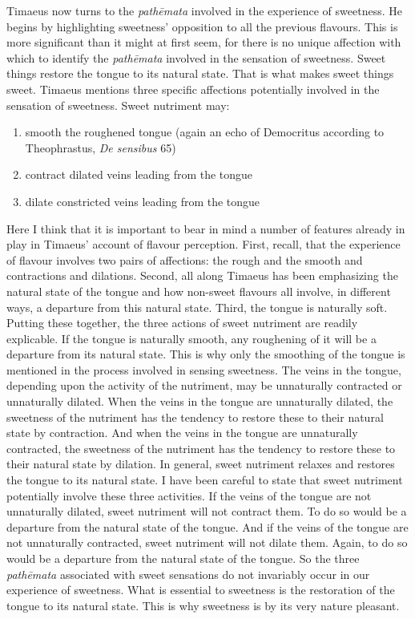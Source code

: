 Timaeus now turns to the \emph{pathēmata} involved in the experience of sweetness. He begins by highlighting sweetness' opposition to all the previous flavours. This is more significant than it might at first seem, for there is no unique affection with which to identify the \emph{pathēmata} involved in the sensation of sweetness. Sweet things restore the tongue to its natural state. That is what makes sweet things sweet. Timaeus mentions three specific affections potentially involved in the sensation of sweetness. Sweet nutriment may:
\begin{enumerate}[(1)]
	\item smooth the roughened tongue (again an echo of Democritus according to Theophrastus, \emph{De sensibus} 65)
	\item contract dilated veins leading from the tongue
	\item dilate constricted veins leading from the tongue
\end{enumerate}
Here I think that it is important to bear in mind a number of features already in play in Timaeus' account of flavour perception. First, recall, that the experience of flavour involves two pairs of affections: the rough and the smooth and contractions and dilations. Second, all along Timaeus has been emphasizing the natural state of the tongue and how non-sweet flavours all involve, in different ways, a departure from this natural state. Third, the tongue is naturally soft. Putting these together, the three actions of sweet nutriment are readily explicable. If the tongue is naturally smooth, any roughening of it will be a departure from its natural state. This is why only the smoothing of the tongue is mentioned in the process involved in sensing sweetness. The veins in the tongue, depending upon the activity of the nutriment, may be unnaturally contracted or unnaturally dilated. When the veins in the tongue are unnaturally dilated, the sweetness of the nutriment has the tendency to restore these to their natural state by contraction. And when the veins in the tongue are unnaturally contracted, the sweetness of the nutriment has the tendency to restore these to their natural state by dilation. In general, sweet nutriment relaxes and restores the tongue to its natural state. I have been careful to state that sweet nutriment potentially involve these three activities. If the veins of the tongue are not unnaturally dilated, sweet nutriment will not contract them. To do so would be a departure from the natural state of the tongue. And if the veins of the tongue are not unnaturally contracted, sweet nutriment will not dilate them. Again, to do so would be a departure from the natural state of the tongue. So the three \emph{pathēmata} associated with sweet sensations do not invariably occur in our experience of sweetness. What is essential to sweetness is the restoration of the tongue to its natural state. This is why sweetness is by its very nature pleasant.

